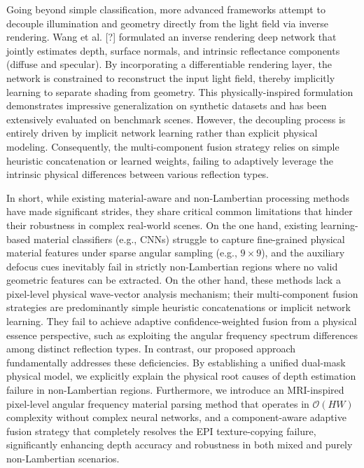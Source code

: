 \documentclass[journal]{IEEEtran}
\begin{document}
Going beyond simple classification, more advanced frameworks attempt to decouple illumination and geometry directly from the light field via inverse rendering. Wang et al. [?] formulated an inverse rendering deep network that jointly estimates depth, surface normals, and intrinsic reflectance components (diffuse and specular). By incorporating a differentiable rendering layer, the network is constrained to reconstruct the input light field, thereby implicitly learning to separate shading from geometry. This physically-inspired formulation demonstrates impressive generalization on synthetic datasets and has been extensively evaluated on benchmark scenes. However, the decoupling process is entirely driven by implicit network learning rather than explicit physical modeling. Consequently, the multi-component fusion strategy relies on simple heuristic concatenation or learned weights, failing to adaptively leverage the intrinsic physical differences between various reflection types.

In short, while existing material-aware and non-Lambertian processing methods have made significant strides, they share critical common limitations that hinder their robustness in complex real-world scenes. On the one hand, existing learning-based material classifiers (e.g., CNNs) struggle to capture fine-grained physical material features under sparse angular sampling (e.g., $9 \times 9$), and the auxiliary defocus cues inevitably fail in strictly non-Lambertian regions where no valid geometric features can be extracted. On the other hand, these methods lack a pixel-level physical wave-vector analysis mechanism; their multi-component fusion strategies are predominantly simple heuristic concatenations or implicit network learning. They fail to achieve adaptive confidence-weighted fusion from a physical essence perspective, such as exploiting the angular frequency spectrum differences among distinct reflection types. In contrast, our proposed approach fundamentally addresses these deficiencies. By establishing a unified dual-mask physical model, we explicitly explain the physical root causes of depth estimation failure in non-Lambertian regions. Furthermore, we introduce an MRI-inspired pixel-level angular frequency material parsing method that operates in $\mathcal{O}(HW)$ complexity without complex neural networks, and a component-aware adaptive fusion strategy that completely resolves the EPI texture-copying failure, significantly enhancing depth accuracy and robustness in both mixed and purely non-Lambertian scenarios.
\end{document}
